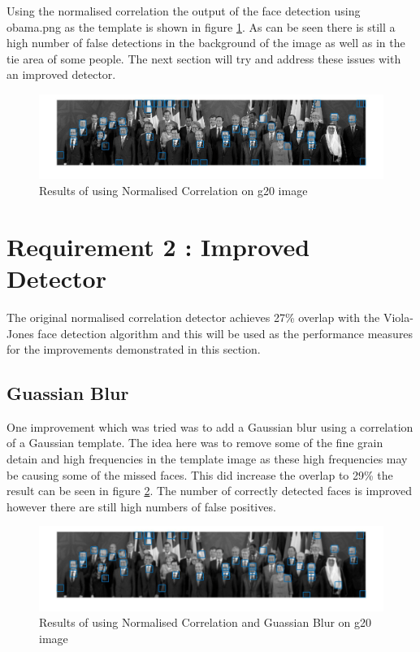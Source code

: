 \documentclass{article}
\begin{document}
Using the normalised correlation the output of the face detection using obama.png
as the template is shown in figure \ref{fig:normalisedcor}. As can be seen there
is still a high number of false detections in the background of the image as well
as in the tie area of some people. The next section will try and address these issues
with an improved detector.\\

\begin{figure}[H]
  \includegraphics[width=\linewidth]{normalisedCor.jpg}
  \caption{Results of using Normalised Correlation on g20 image}
  \label{fig:normalisedcor}
\end{figure}

\section{Requirement 2 : Improved Detector}

The original normalised correlation detector achieves 27\% overlap with the Viola-Jones
face detection algorithm and this will be used as the performance measures for
the improvements demonstrated in this section.\\

\subsection{Guassian Blur}

One improvement which was tried was to add a Gaussian blur using a correlation of
a Gaussian template. The idea here was to remove some of the fine grain detain and
high frequencies in the template image as these high frequencies may be causing
some of the missed faces. This did increase the overlap to 29\% the result can
be seen in figure \ref{fig:blurred}. The number of correctly detected faces is
improved however there are still high numbers of false positives.\\

\begin{figure}[H]
  \includegraphics[width=\linewidth]{blurred.jpg}
  \caption{Results of using Normalised Correlation and Guassian Blur on g20 image}
  \label{fig:blurred}
\end{figure}
\end{document}
